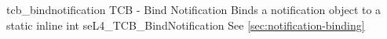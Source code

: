 %
%
%
%

\apidoc
{tcb_bindnotification}
{TCB - Bind Notification}
{Binds a notification object to a  }
{static inline int seL4\_TCB\_BindNotification}
{
}
{\errorenumdesc}
{See \autoref{sec:notification-binding}}

